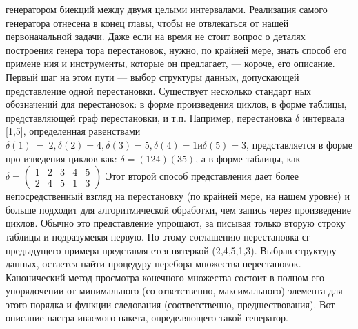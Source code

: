 \documentclass{../../template/mai_book}
\begin{document}
генератором биекций между двумя целыми интервалами. Реализация
самого генератора отнесена в конец главы, чтобы не отвлекаться от
нашей первоначальной задачи.
Даже если на время не стоит вопрос о деталях построения генера­
тора перестановок, нужно, по крайней мере, знать способ его примене­
ния и инструменты, которые он предлагает, — короче, его описание.
Первый шаг на этом пути — выбор структуры данных, допускающей
представление одной перестановки. Существует несколько стандарт­
ных обозначений для перестановок: в форме произведения циклов, в
форме таблицы, представляющей граф перестановки, и т.п. Например,
перестановка $\delta$ интервала [1,5], определенная равенствами $\delta(1)~=~2,
\delta(2) = 4, \delta(3) = 5, \delta(4) = 1 и \delta(5) = 3$, представляется в форме про­
изведения циклов как: $\delta = ( 1 2 4 )( 3 5 )$, а в форме таблицы, как
$\delta = \begin{pmatrix} 1 & 2 & 3 & 4 & 5 \\ 2 & 4 & 5 & 1 & 3 \end{pmatrix} $
Этот второй способ представления дает более
непосредственный взгляд на перестановку (по крайней мере, на нашем
уровне) и больше подходит для алгоритмической обработки, чем запись
через произведение циклов. Обычно это представление упрощают, за­
писывая только вторую строку таблицы и подразумевая первую. По
этому соглашению перестановка сг предыдущего примера представля­
ется пятеркой (2,4,5,1,3).
Выбрав структуру данных, остается найти процедуру перебора
множества перестановок. Канонический метод просмотра конечного
множества состоит в полном его упорядочении от минимального (со­
ответственно, максимального) элемента для этого порядка и функции
следования (соответственно, предшествования). Вот описание настра­
иваемого пакета, определяющего такой генератор.

\newpage
\end{document}

